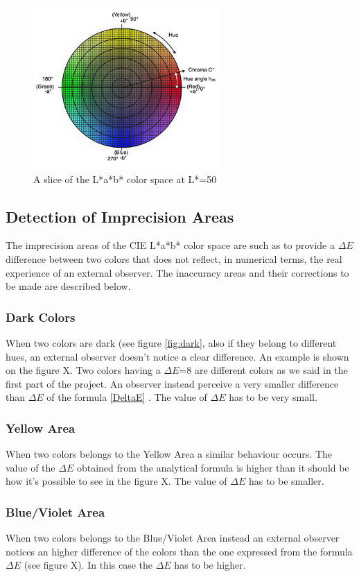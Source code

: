 \documentclass{article}
\begin{document}
\begin{figure}[!h]
	\center
 	\includegraphics[width=200pt]{./img/ciecolordspace}
  	\caption{A slice of the L*a*b* color space at L*=50}\label{fig:ciecolordspace}
\end{figure}

\subsection{Detection of Imprecision Areas} 
The imprecision areas of the CIE L*a*b* color space are such as to provide a $\Delta E$ difference between two colors that does not reflect, in numerical terms, the real experience of an external observer. The inaccuracy areas and their corrections to be made are described below.
\subsubsection{Dark Colors}
When two colors are dark (see figure \ref{fig:dark}, also if they belong to different hues, an external observer doesn't notice a clear difference. An example is shown on the figure X. Two colors having a $\Delta E$=8 are different colors as we said in the first part of the project. An observer instead perceive a very smaller difference than $\Delta E$ of the formula \ref{DeltaE} . The value of $\Delta E$ has to be very small.
\subsubsection{Yellow Area}
When two colors belongs to the Yellow Area a similar behaviour occurs. The value of the $\Delta E$ obtained from the analytical formula is higher than it should be how it's possible to see in the figure X. The value of $\Delta E$ has to be smaller.
\subsubsection{Blue/Violet Area}
When two colors belongs to the Blue/Violet Area instead an external observer notices an higher difference of the colors than the one expressed from the formula $\Delta E$ (see figure X). In this case the $\Delta E$ has to be higher.
\end{document}
